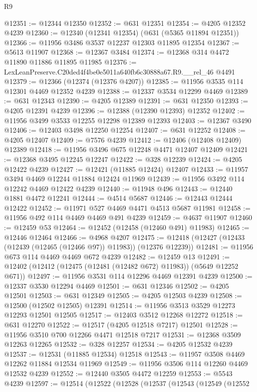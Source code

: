\begin{lexlean}{R9}
\begin{coremodule}
@12351 := @12344 @12350
@12352 := @631 @12351
@12354 := @4205 @12352 @4239
@12360 := @12340 (@12341 @12354) (@631 (@5365 @11894 @12351))
@12366 := @11956 @3486 @3537 @12237 @12303 @11895 @12354
@12367 := @5613 @11907
@12368 := @12367 @3484
@12374 := @12368 @314 @4472 @11890 @11886 @11895 @11985
@12376 := LexLeanPreserve.C20ded4f4be0e5011a640fb6c30888a67.R9.__rel_46 @4491
@12379 := @12366 (@12374 (@12376 @4207))
@12385 := @11956 @3535 @114 @12301 @4469 @12352 @4239
@12388 := @12337 @3534 @12299 @4469
@12389 := @631 @12343
@12390 := @4205 @12389
@12391 := @631 @12350
@12393 := @4205 @12391 @4239
@12396 := @12388 (@12390 @12393) @12352
@12402 := @11956 @3499 @3533 @12255 @12298 @12389 @12393
@12403 := @12367 @3490
@12406 := @12403 @3498 @12250 @12254
@12407 := @631 @12252
@12408 := @4205 @12407
@12409 := @7576 @4239
@12412 := @12406 (@12408 @12409) @12389
@12418 := @11956 @3496 @675 @12248 @4471 @12407 @12409
@12421 := @12368 @3495 @12245 @12247
@12422 := @328 @12239
@12424 := @4205 @12422 @4239
@12427 := @12421 (@11885 @12424) @12407
@12433 := @11957 @3494 @4469 @12244 @11884 @12424 @11969
@12439 := @11956 @3492 @114 @12242 @4469 @12422 @4239
@12440 := @11948 @496
@12443 := @12440 @1881 @4472 @12241
@12444 := @4514 @5687
@12446 := @12443 @12444 @12422
@12452 := @11971 @527 @4469 @4471 @4513 @5687 @11981
@12458 := @11956 @492 @114 @4469 @4469 @491 @4239
@12459 := @4637 @11907
@12460 := @12459 @53
@12464 := @12452 (@12458 (@12460 @491) @11983)
@12465 := @12446 @12464
@12466 := @4968 @4207
@12475 := @12418 (@12427 (@12433 (@12439 (@12465 (@12466 @97)) @11983)) (@12376 @12239))
@12481 := @11956 @673 @114 @4469 @4469 @672 @4239
@12482 := @12459 @13
@12491 := @12402 (@12412 (@12475 (@12481 (@12482 @672) @11983)) (@5649 @12252 @671))
@12497 := @11956 @3531 @114 @12296 @4469 @12391 @4239
@12500 := @12337 @3530 @12294 @4469
@12501 := @631 @12346
@12502 := @4205 @12501
@12503 := @631 @12349
@12505 := @4205 @12503 @4239
@12508 := @12500 (@12502 @12505) @12391
@12514 := @11956 @3513 @3529 @12273 @12293 @12501 @12505
@12517 := @12403 @3512 @12268 @12272
@12518 := @631 @12270
@12522 := @12517 (@4205 @12518 @7217) @12501
@12528 := @11956 @3510 @700 @12266 @4471 @12518 @7217
@12531 := @12368 @3509 @12263 @12265
@12532 := @328 @12257
@12534 := @4205 @12532 @4239
@12537 := @12531 (@11885 @12534) @12518
@12543 := @11957 @3508 @4469 @12262 @11884 @12534 @11969
@12549 := @11956 @3506 @114 @12260 @4469 @12532 @4239
@12552 := @12440 @3505 @4472 @12259
@12553 := @5543 @4239
@12597 := @12514
    (@12522
      (@12528
        (@12537
          (@12543
            (@12549
              (@12552

\end{coremodule}
\end{lexlean}
